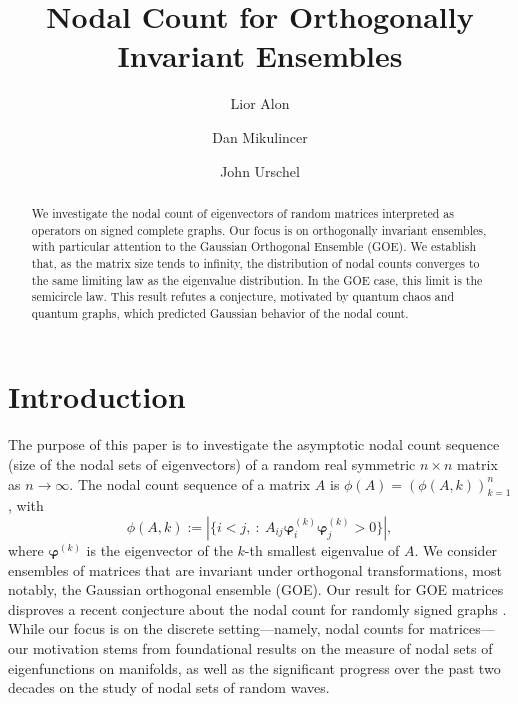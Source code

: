 \documentclass[reqno]{amsart}
\title[Nodal Count for Orthogonally Invariant Ensembles]{Nodal Count for Orthogonally Invariant Ensembles}
\author{Lior Alon}
\author{Dan Mikulincer}
\author{John Urschel}
\numberwithin{equation}{section}
\begin{document}
\begin{abstract}
We investigate the nodal count of eigenvectors of random matrices interpreted as operators on signed complete graphs. Our focus is on orthogonally invariant ensembles, with particular attention to the Gaussian Orthogonal Ensemble (GOE). We establish that, as the matrix size tends to infinity, the distribution of nodal counts converges to the same limiting law as the eigenvalue distribution. In the GOE case, this limit is the semicircle law. This result refutes a conjecture, motivated by quantum chaos and quantum graphs, which predicted Gaussian behavior of the nodal count.
\end{abstract}

\maketitle

\section{Introduction}
The purpose of this paper is to investigate the asymptotic nodal count sequence (size of the nodal sets of eigenvectors) of a random real symmetric $n\times n$ matrix as $n\to\infty$. The nodal count sequence of a matrix $A$ is $\phi(A)=\left(\phi(A,k)\right)_{k=1}^n$, with  
\[\phi(A,k):=\left|\{i<j,\ :\ A_{ij}\bm\varphi^{(k)}_{i}\bm\varphi^{(k)}_{j}>0\}\right|,\]
  where $\bm\varphi^{(k)}$ is the eigenvector of the  $k$-th smallest eigenvalue of $A$.
We consider ensembles of matrices that are invariant under orthogonal transformations, most notably, the Gaussian orthogonal ensemble (GOE). Our result for GOE matrices disproves a recent conjecture about the nodal count for randomly signed graphs \cite{alon2023morse}. While our focus is on the discrete setting—namely, nodal counts for matrices—our motivation stems from foundational results on the measure of nodal sets of eigenfunctions on manifolds, as well as the significant progress over the past two decades on the study of nodal sets of random waves.
\end{document}
